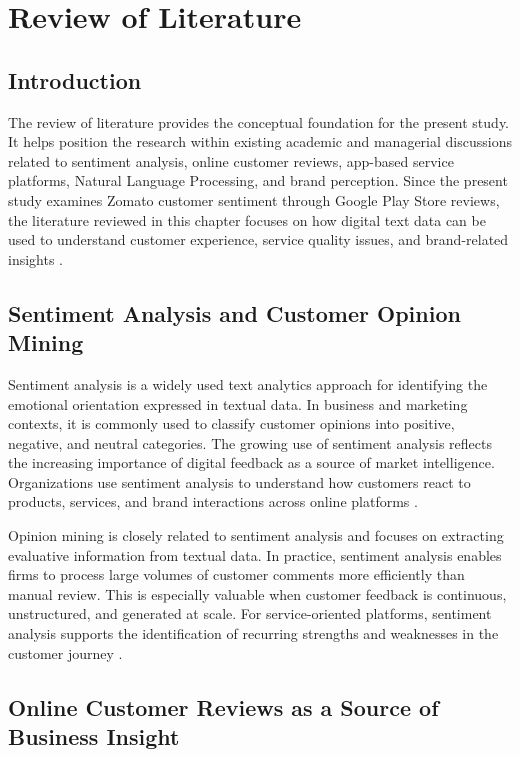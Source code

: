 \chapter{Review of Literature}

\section{Introduction}

The review of literature provides the conceptual foundation for the present study. It helps position the research within existing academic and managerial discussions related to sentiment analysis, online customer reviews, app-based service platforms, Natural Language Processing, and brand perception. Since the present study examines Zomato customer sentiment through Google Play Store reviews, the literature reviewed in this chapter focuses on how digital text data can be used to understand customer experience, service quality issues, and brand-related insights \cite{pang2008,liu2012,lemon2016}.

\section{Sentiment Analysis and Customer Opinion Mining}

Sentiment analysis is a widely used text analytics approach for identifying the emotional orientation expressed in textual data. In business and marketing contexts, it is commonly used to classify customer opinions into positive, negative, and neutral categories. The growing use of sentiment analysis reflects the increasing importance of digital feedback as a source of market intelligence. Organizations use sentiment analysis to understand how customers react to products, services, and brand interactions across online platforms \cite{pang2008,liu2012}.

Opinion mining is closely related to sentiment analysis and focuses on extracting evaluative information from textual data. In practice, sentiment analysis enables firms to process large volumes of customer comments more efficiently than manual review. This is especially valuable when customer feedback is continuous, unstructured, and generated at scale. For service-oriented platforms, sentiment analysis supports the identification of recurring strengths and weaknesses in the customer journey \cite{pang2008,liu2012,hutto2014}.

\section{Online Customer Reviews as a Source of Business Insight}

